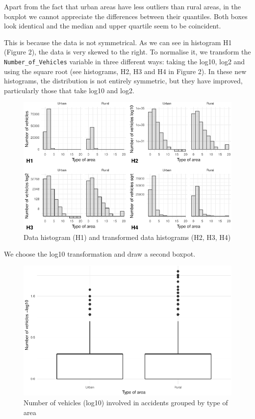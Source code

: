 \documentclass[]{article}
\begin{document}
Apart from the fact that urban areas have less outliers than rural
areas, in the boxplot we cannot appreciate the differences between their
quantiles. Both boxes look identical and the median and upper quartile
seem to be coincident.

This is because the data is not symmetrical. As we can see in histogram
H1 (Figure 2), the data is very skewed to the right. To normalise it, we
transform the \texttt{Number\_of\_Vehicles} variable in three different
ways: taking the log10, log2 and using the square root (see histograms,
H2, H3 and H4 in Figure 2). In these new histograms, the distribution is
not entirely symmetric, but they have improved, particularly those that
take log10 and log2.

\begin{figure}[H]

{\centering \includegraphics{README_files/figure-latex/fig2-1} 

}

\caption{Data histogram (H1) and transformed data histograms (H2, H3, H4)}\label{fig:fig2}
\end{figure}

We choose the log10 transformation and draw a second boxpot.

\begin{figure}[H]

{\centering \includegraphics{README_files/figure-latex/fig3-1} 

}

\caption{Number of vehicles (log10) involved in accidents grouped by type of area}\label{fig:fig3}
\end{figure}
\end{document}
